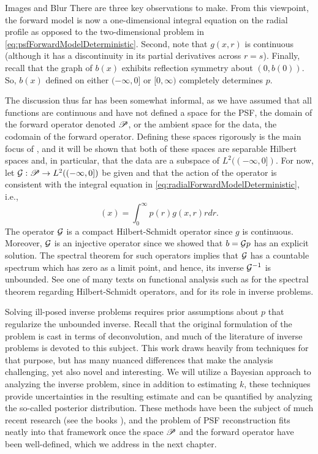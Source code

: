 \begin{chapter}{Images and Blur}
  There are three key observations to make.
  From this viewpoint, the forward model is now a one-dimensional integral equation on the radial profile as opposed to the two-dimensional problem in \eqref{eq:psfForwardModelDeterministic}.
  Second, note that $g(x,r)$ is continuous (although it has a discontinuity in its partial derivatives across $r=s$).
  Finally, recall that the graph of $b(x)$ exhibits reflection symmetry about $(0,b(0))$.
  So, $b(x)$ defined on either $(-\infty,0]$ or $[0,\infty)$ completely determines $p$.

  The discussion thus far has been somewhat informal, as we have assumed that all functions are continuous and have not defined a space for the PSF, the domain of the forward operator denoted $\mathscr P$, or the ambient space for the data, the codomain of the forward operator. %
  Defining these spaces rigorously is the main focus of , and it will be shown that both of these spaces are separable Hilbert spaces and, in particular, that the data are a subspace of $L^2((-\infty,0])$.
   For now, let $\mathcal G: \mathscr P \to L^2((-\infty,0])$ be given and that the action of the operator is consistent with the integral equation in \eqref{eq:radialForwardModelDeterministic}, i.e., 
  \begin{equation}
    [\G p](x) = \int_0^\infty p(r) g(x,r) r dr.
  \end{equation}
  The operator $\mathcal G$ is a compact Hilbert-Schmidt operator since $g$ is continuous.
  Moreover, $\mathcal G$ is an injective operator since we showed that $b = \mathcal G p$ has an explicit solution. 
  The spectral theorem for such operators implies that $\mathcal G$ has a countable spectrum which has zero as a limit point, and hence, its inverse $\mathcal G^{-1}$ is unbounded. %
  See one of many texts on functional analysis such as \citep{bachman1966,rudin1991} for the spectral theorem regarding Hilbert-Schmidt operators, and \citep{tikhonov1963,vogel2002,morozov1993} for its role in inverse problems.

  Solving ill-posed inverse problems requires prior assumptions about $p$ that regularize the unbounded inverse.
  Recall that the original formulation of the problem is cast in terms of deconvolution, and much of the literature of inverse problems is devoted to this subject. 
  This work draws heavily from techniques for that purpose, but has many nuanced differences that make the analysis challenging, yet also novel and interesting.
  We will utilize a Bayesian approach to analyzing the inverse problem, since in addition to estimating $k$, these techniques provide uncertainties in the resulting estimate and can be quantified by analyzing the so-called posterior distribution.
  These methods have been the subject of much recent research (see the books \citep{calvetti2007introduction,kaipo2005,stuart2010}), and the problem of PSF reconstruction fits neatly into that framework once the space $\mathscr P$ and the forward operator have been well-defined, which we address in the next chapter.

\end{chapter}
